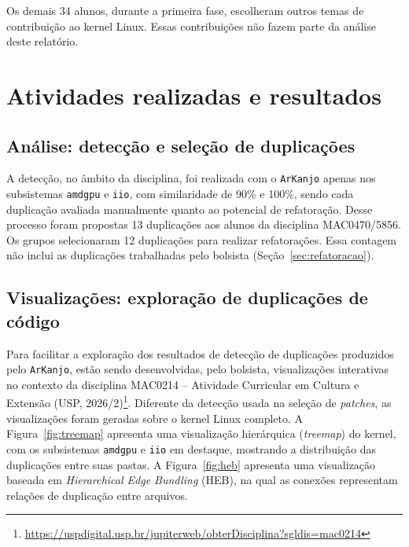 \documentclass[oneside]{abntlatex}
\begin{document}
Os demais 34 alunos, durante a primeira fase, escolheram outros temas de contribuição ao kernel Linux. Essas contribuições não fazem parte da análise deste relatório.

\section{Atividades realizadas e resultados}

\subsection{Análise: detecção e seleção de duplicações}\label{sec:deteccao}

A detecção, no âmbito da disciplina, foi realizada com o \texttt{ArKanjo} apenas nos subsistemas \texttt{amdgpu} e \texttt{iio}, com similaridade de 90\% e 100\%, sendo cada duplicação avaliada manualmente quanto ao potencial de refatoração. Desse processo foram propostas 13 duplicações aos alunos da disciplina MAC0470/5856. Os grupos selecionaram 12 duplicações para realizar refatorações. Essa contagem não inclui as duplicações trabalhadas pelo bolsista (Seção~\ref{sec:refatoracao}).

\subsection{Visualizações: exploração de duplicações de código}\label{sec:visualizacoes}

Para facilitar a exploração dos resultados de detecção de duplicações produzidos pelo \texttt{ArKanjo}, estão sendo desenvolvidas, pelo bolsista, visualizações interativas no contexto da disciplina MAC0214 -- Atividade Curricular em Cultura e Extensão (USP, 2026/2)\footnote{\url{https://uspdigital.usp.br/jupiterweb/obterDisciplina?sgldis=mac0214}}. Diferente da detecção usada na seleção de \textit{patches}, as visualizações foram geradas sobre o kernel Linux completo. A Figura~\ref{fig:treemap} apresenta uma visualização hierárquica (\textit{treemap}) do kernel, com os subsistemas \texttt{amdgpu} e \texttt{iio} em destaque, mostrando a distribuição das duplicações entre suas pastas. A Figura~\ref{fig:heb} apresenta uma visualização baseada em \textit{Hierarchical Edge Bundling} (HEB), na qual as conexões representam relações de duplicação entre arquivos.
\end{document}
